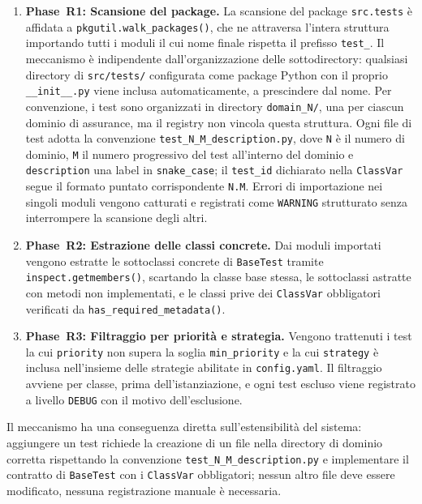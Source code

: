 \begin{enumerate}
      \item \textbf{Phase~R1: Scansione del package.} La scansione del package \texttt{src.tests} è affidata a \texttt{pkgutil.walk\_packages()}, che ne attraversa l'intera struttura importando tutti i moduli il cui nome finale rispetta il prefisso \texttt{test\_}. Il meccanismo è indipendente dall'organizzazione delle sottodirectory: qualsiasi directory di \texttt{src/tests/} configurata come package Python con il proprio \texttt{\_\_init\_\_.py} viene inclusa automaticamente, a prescindere dal nome. Per convenzione, i test sono organizzati in directory \texttt{domain\_N/}, una per ciascun dominio di assurance, ma il registry non vincola questa struttura. Ogni file di test adotta la convenzione \texttt{test\_N\_M\_description.py}, dove \texttt{N} è il numero di dominio, \texttt{M} il numero progressivo del test all'interno del dominio e \texttt{description} una label in \texttt{snake\_case}; il \texttt{test\_id} dichiarato nella \texttt{ClassVar} segue il formato puntato corrispondente \texttt{N.M}. Errori di importazione nei singoli moduli vengono catturati e registrati come \texttt{WARNING} strutturato senza interrompere la scansione degli altri.

      \item \textbf{Phase~R2: Estrazione delle classi concrete.} Dai moduli importati vengono estratte le sottoclassi concrete di \texttt{BaseTest} tramite \texttt{inspect.getmembers()}, scartando la classe base stessa, le sottoclassi astratte con metodi non implementati, e le classi prive dei \texttt{ClassVar} obbligatori verificati da \texttt{has\_required\_metadata()}.

      \item \textbf{Phase~R3: Filtraggio per priorità e strategia.} Vengono trattenuti i test la cui \texttt{priority} non supera la soglia \texttt{min\_priority} e la cui \texttt{strategy} è inclusa nell'insieme delle strategie abilitate in \texttt{config.yaml}. Il filtraggio avviene per classe, prima dell'istanziazione, e ogni test escluso viene registrato a livello \texttt{DEBUG} con il motivo dell'esclusione.
\end{enumerate}

Il meccanismo ha una conseguenza diretta sull'estensibilità del sistema: aggiungere un test richiede la creazione di un file nella directory di dominio corretta rispettando la convenzione \texttt{test\_N\_M\_description.py} e implementare il contratto di \texttt{BaseTest} con i \texttt{ClassVar} obbligatori; nessun altro file deve essere modificato, nessuna registrazione manuale è necessaria.

